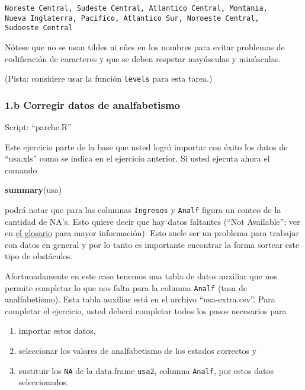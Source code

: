 \documentclass[]{article}
\newenvironment{Shaded}{}{}
\newcommand{\KeywordTok}[1]{\textcolor[rgb]{0.00,0.44,0.13}{\textbf{{#1}}}}
\newcommand{\NormalTok}[1]{{#1}}
\begin{document}
\begin{verbatim}
Noreste Central, Sudeste Central, Atlantico Central, Montania,
Nueva Inglaterra, Pacifico, Atlantico Sur, Noroeste Central,
Sudoeste Central
\end{verbatim}

Nótese que no se usan tildes ni eñes en los nombres para evitar
problemas de codificación de caracteres y que se deben respetar
mayúsculas y minúsculas.

(Pista: considere usar la función \texttt{levels} para esta tarea.)

\subsubsection{1.b Corregir datos de analfabetismo}

Script: ``parche.R''

Este ejercicio parte de la base que usted logró importar con éxito los
datos de ``usa.xls'' como se indica en el ejercicio anterior. Si usted
ejecuta ahora el comando

\begin{Shaded}
\begin{Highlighting}[]
\KeywordTok{summary}\NormalTok{(usa)}
\end{Highlighting}
\end{Shaded}

podrá notar que para las columnas \texttt{Ingresos} y \texttt{Analf}
figura un conteo de la cantidad de NA's. Esto quiere decir que hay datos
faltantes (``Not Available''; ver en
\href{http://eva.universidad.edu.uy/mod/glossary/view.php?id=116962}{el
glosario} para mayor información). Esto suele ser un problema para
trabajar con datos en general y por lo tanto es importante encontrar la
forma sortear este tipo de obstáculos.

Afortunadamente en este caso tenemos una tabla de datos auxiliar que nos
permite completar lo que nos falta para la columna \texttt{Analf} (tasa
de analfabetismo). Esta tabla auxiliar está en el archivo
``usa-extra.csv''. Para completar el ejercicio, usted deberá completar
todos los pasos necesarios para

\begin{enumerate}[1.]
\item
  importar estos datos,
\item
  seleccionar los valores de analfabetismo de los estados correctos y
\item
  sustituir los \texttt{NA} de la data.frame \texttt{usa2}, columna
  \texttt{Analf}, por estos datos seleccionados.
\end{enumerate}
\end{document}

